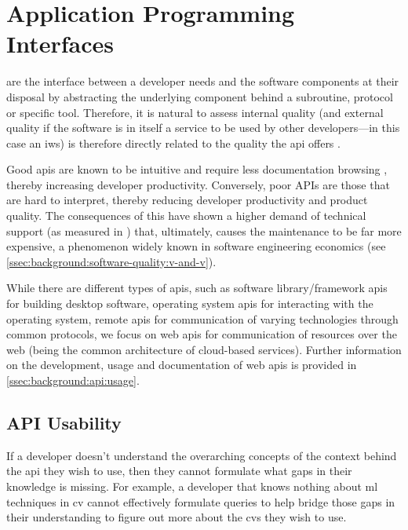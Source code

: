 \section{Application Programming Interfaces}
\label{sec:background:api}

 are the interface between a developer needs and the software components at their disposal \citep{Arnold:2005vc} by abstracting the underlying component behind a subroutine, protocol or specific tool. Therefore, it is natural to assess internal quality (and external quality if the software is in itself a service to be used by other developers---in this case an \gls{iws}) is therefore directly related to the quality the \gls{api} offers \citep{Ko:2004td}. 

Good \glspl{api} are known to be intuitive and require less documentation browsing \citep{Piccioni:2013em}, thereby increasing developer productivity. Conversely, poor APIs are those that are hard to interpret, thereby reducing developer productivity and product quality. The consequences of this have shown a higher demand of technical support (as measured in \citep{Henning:2009hz}) that, ultimately, causes the maintenance to be far more expensive, a phenomenon widely known in software engineering economics (see \cref{ssec:background:software-quality:v-and-v}).

While there are different types of \glspl{api}, such as software library/framework \glspl{api} for building desktop software, operating system \glspl{api} for interacting with the operating system, remote \glspl{api} for communication of varying technologies through common protocols, we focus on web \glspl{api} for communication of resources over the web (being the common architecture of cloud-based services). Further information on the development, usage and documentation of web \glspl{api} is provided in \cref{ssec:background:api:usage}.


\subsection{API Usability}
\label{ssec:background:api:usability}

If a developer doesn't understand the overarching concepts of the context behind the \gls{api} they wish to use, then they cannot formulate what gaps in their knowledge is missing. For example, a developer that knows nothing about \gls{ml} techniques in \gls{cv} cannot effectively formulate queries to help bridge those gaps in their understanding to figure out more about the \gls{cvs} they wish to use. 

